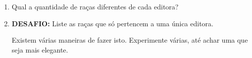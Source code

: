 \documentclass[
  11pt]{report}
\begin{document}
\begin{enumerate}

\item
  Qual a quantidade de raças diferentes de cada editora?

\item
  \textbf{DESAFIO:} Liste as raças que só pertencem a uma única editora.

  Existem várias maneiras de fazer isto. Experimente várias, até achar uma que seja mais elegante.

\end{enumerate}
\end{document}
